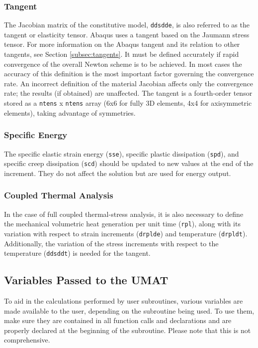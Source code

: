\documentclass[10pt,letterpaper,oneside]{report}
\begin{document}
\subsubsection{Tangent}
The Jacobian matrix of the constitutive model, \texttt{ddsdde}, is also referred to as the tangent or elasticity tensor.  Abaqus uses a tangent based on the Jaumann stress tensor.  For more information on the Abaqus tangent and its relation to other tangents, see Section \ref{subsec:tangents}.  It must be defined accurately if rapid convergence of the overall Newton scheme is to be achieved. In most cases the accuracy of this definition is the most important factor governing the convergence rate. An incorrect definition of the material Jacobian affects only the convergence rate; the results (if obtained) are unaffected.  The tangent is a fourth-order tensor stored as a \texttt{ntens} x \texttt{ntens} array (6x6 for fully 3D elements, 4x4 for axisymmetric elements), taking advantage of symmetries.  

\subsubsection{Specific Energy}
The specific elastic strain energy (\texttt{sse}), specific plastic dissipation (\texttt{spd}), and specific creep dissipation (\texttt{scd}) should be updated to new values at the end of the increment.  They do not affect the solution but are used for energy output.  

\subsubsection{Coupled Thermal Analysis}
In the case of full coupled thermal-stress analysis, it is also necessary to define the mechanical volumetric heat generation per unit time (\texttt{rpl}), along with its variation with respect to strain increments (\texttt{drplde}) and temperature (\texttt{drpldt}).  Additionally, the variation of the stress increments with respect to the temperature (\texttt{ddsddt}) is needed for the tangent.  


\subsection{Variables Passed to the UMAT}
To aid in the calculations performed by user subroutines, various variables are made available to the user, depending on the subroutine being used.  To use them, make sure they are contained in all function calls and declarations and are properly declared at the beginning of the subroutine.  Please note that this is not comprehensive.  
\end{document}
